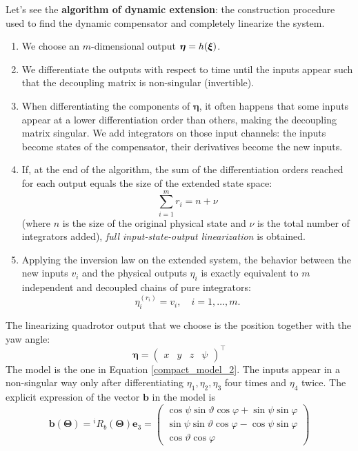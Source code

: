 \documentclass[10pt, a4paper]{report}
\begin{document}
Let's see the \textbf{algorithm of dynamic extension}: the construction procedure used to find the dynamic compensator and completely linearize the system.\begin{enumerate}
    \item We choose an $m$-dimensional output $\boldsymbol{\eta}=h({\boldsymbol{\xi}})$.
    \item We differentiate the outputs with respect to time until the inputs appear such that the decoupling matrix is non-singular (invertible).
    \item When differentiating the components of $\boldsymbol{\eta}$, it often happens that some inputs appear at a lower differentiation order than others, making the decoupling matrix singular. We add integrators on those input channels: the inputs become states of the compensator, their derivatives become the new inputs.
    \item If, at the end of the algorithm, the sum of the differentiation orders reached for each output equals the size of the extended state space:$$\sum_{i=1}^m r_i = n + \nu$$
    (where $n$ is the size of the original physical state and $\nu$ is the total number of integrators added), \textit{full input-state-output linearization} is obtained.
    \item Applying the inversion law on the extended system, the behavior between the new inputs $v_i$ and the physical outputs $\eta_i$ is exactly equivalent to $m$ independent and decoupled chains of pure integrators:\begin{equation}
        \eta_i^{(r_i)} = v_i, \quad i = 1, \dots, m.
    \end{equation}
\end{enumerate}
The linearizing quadrotor output that we choose is the position together with the yaw angle:\begin{equation}
    \boldsymbol{\eta}=\begin{pmatrix}
        x&y&z&\psi 
    \end{pmatrix}^\top
\end{equation}
The model is the one in Equation \eqref{compact_model_2}. The inputs appear in a non-singular way only after differentiating $\eta_1,\eta_2,\eta_3$ four times and $\eta_4$ twice. The explicit expression of the vector $\mathbf b$ in the model is\begin{equation}
    \mathbf  b(\boldsymbol{\Theta})={}^iR_b(\boldsymbol{\Theta})\mathbf e_3
    =\begin{pmatrix}
    \cos\psi \sin\vartheta \cos\varphi + \sin\psi \sin\varphi \\
    \sin\psi \sin\vartheta \cos\varphi - \cos\psi \sin\varphi \\
    \cos\vartheta \cos\varphi
    \end{pmatrix}
\end{equation}
\end{document}
